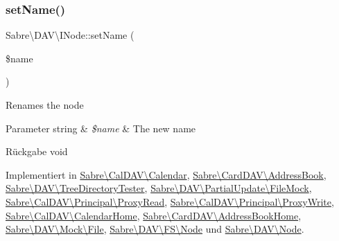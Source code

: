 \mbox{\label{interface_sabre_1_1_d_a_v_1_1_i_node_ac90fa5526e98def2e1f51bc57a772366}} 
\subsubsection{\texorpdfstring{set\+Name()}{setName()}}
{\footnotesize\ttfamily Sabre\textbackslash{}\+D\+A\+V\textbackslash{}\+I\+Node\+::set\+Name (\begin{DoxyParamCaption}\item[{}]{\$name }\end{DoxyParamCaption})}

Renames the node


\begin{DoxyParams}[1]{Parameter}
string & {\em \$name} & The new name \\
\hline
\end{DoxyParams}
\begin{DoxyReturn}{Rückgabe}
void 
\end{DoxyReturn}


Implementiert in \mbox{\hyperlink{class_sabre_1_1_cal_d_a_v_1_1_calendar_a4ed32462bdf6e4bfcefeff3349db7ba0}{Sabre\textbackslash{}\+Cal\+D\+A\+V\textbackslash{}\+Calendar}}, \mbox{\hyperlink{class_sabre_1_1_card_d_a_v_1_1_address_book_a2a642797fd5aaf056145b4cde8301514}{Sabre\textbackslash{}\+Card\+D\+A\+V\textbackslash{}\+Address\+Book}}, \mbox{\hyperlink{class_sabre_1_1_d_a_v_1_1_tree_directory_tester_ab53a32b6d72da045de6896915167ba8a}{Sabre\textbackslash{}\+D\+A\+V\textbackslash{}\+Tree\+Directory\+Tester}}, \mbox{\hyperlink{class_sabre_1_1_d_a_v_1_1_partial_update_1_1_file_mock_acf0b86fd1a91b7795bc565831f302f15}{Sabre\textbackslash{}\+D\+A\+V\textbackslash{}\+Partial\+Update\textbackslash{}\+File\+Mock}}, \mbox{\hyperlink{class_sabre_1_1_cal_d_a_v_1_1_principal_1_1_proxy_read_a1735391e37c5fa938d06a18faee5cadb}{Sabre\textbackslash{}\+Cal\+D\+A\+V\textbackslash{}\+Principal\textbackslash{}\+Proxy\+Read}}, \mbox{\hyperlink{class_sabre_1_1_cal_d_a_v_1_1_principal_1_1_proxy_write_a4daacb7dff7adb4193cd371148f6037e}{Sabre\textbackslash{}\+Cal\+D\+A\+V\textbackslash{}\+Principal\textbackslash{}\+Proxy\+Write}}, \mbox{\hyperlink{class_sabre_1_1_cal_d_a_v_1_1_calendar_home_aaa0c4f3c31b554595466644949399be0}{Sabre\textbackslash{}\+Cal\+D\+A\+V\textbackslash{}\+Calendar\+Home}}, \mbox{\hyperlink{class_sabre_1_1_card_d_a_v_1_1_address_book_home_a5f10222c82a11fdc8af8b8588b6b957b}{Sabre\textbackslash{}\+Card\+D\+A\+V\textbackslash{}\+Address\+Book\+Home}}, \mbox{\hyperlink{class_sabre_1_1_d_a_v_1_1_mock_1_1_file_af7fc32874a561f416150bbcb4e9c856c}{Sabre\textbackslash{}\+D\+A\+V\textbackslash{}\+Mock\textbackslash{}\+File}}, \mbox{\hyperlink{class_sabre_1_1_d_a_v_1_1_f_s_1_1_node_a9a4cd0359942b6640637502788bcc6d8}{Sabre\textbackslash{}\+D\+A\+V\textbackslash{}\+F\+S\textbackslash{}\+Node}} und \mbox{\hyperlink{class_sabre_1_1_d_a_v_1_1_node_a1d029db9c2900104c89d1493ffa9199d}{Sabre\textbackslash{}\+D\+A\+V\textbackslash{}\+Node}}.




